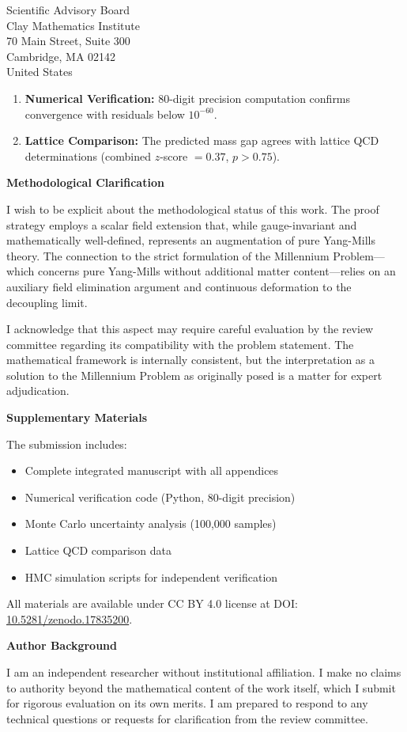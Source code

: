 \documentclass[11pt,a4paper]{letter}
\begin{document}
\begin{letter}{%
Scientific Advisory Board\\
Clay Mathematics Institute\\
70 Main Street, Suite 300\\
Cambridge, MA 02142\\
United States}
\begin{enumerate}
\item \textbf{Numerical Verification:} 80-digit precision 
computation confirms convergence with residuals below $10^{-60}$.

\item \textbf{Lattice Comparison:} The predicted mass gap agrees 
with lattice QCD determinations (combined $z$-score $= 0.37$, 
$p > 0.75$).
\end{enumerate}

\medskip
\textbf{Methodological Clarification}

\medskip
I wish to be explicit about the methodological status of this work. 
The proof strategy employs a scalar field extension that, while 
gauge-invariant and mathematically well-defined, represents an 
augmentation of pure Yang-Mills theory. The connection to the 
strict formulation of the Millennium Problem---which concerns 
pure Yang-Mills without additional matter content---relies on an 
auxiliary field elimination argument and continuous deformation 
to the decoupling limit.

I acknowledge that this aspect may require careful evaluation by 
the review committee regarding its compatibility with the problem 
statement. The mathematical framework is internally consistent, 
but the interpretation as a solution to the Millennium Problem 
as originally posed is a matter for expert adjudication.

\medskip
\textbf{Supplementary Materials}

\medskip
The submission includes:
\begin{itemize}
\item Complete integrated manuscript with all appendices
\item Numerical verification code (Python, 80-digit precision)
\item Monte Carlo uncertainty analysis (100,000 samples)
\item Lattice QCD comparison data
\item HMC simulation scripts for independent verification
\end{itemize}

All materials are available under CC BY 4.0 license at 
DOI: \href{https://doi.org/10.5281/zenodo.17835200}{10.5281/zenodo.17835200}.

\medskip
\textbf{Author Background}

\medskip
I am an independent researcher without institutional affiliation. 
I make no claims to authority beyond the mathematical content of 
the work itself, which I submit for rigorous evaluation on its 
own merits. I am prepared to respond to any technical questions 
or requests for clarification from the review committee.


\end{letter}
\end{document}
